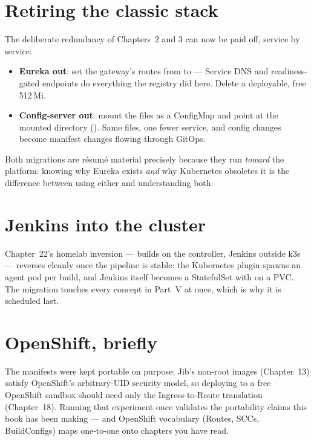 \section{Retiring the classic stack}

The deliberate redundancy of Chapters~2 and 3 can now be paid off,
service by service:

\begin{itemize}
  \item \textbf{Eureka out}: set the gateway's routes from
   to  ---
  Service DNS and readiness-gated endpoints do everything the registry
  did here. Delete a deployable, free 512\,Mi.
  \item \textbf{Config-server out}: mount the 
  files as a ConfigMap and point
   at the mounted directory
  (). Same files, one fewer service, and
  config changes become manifest changes flowing through GitOps.
\end{itemize}

Both migrations are résumé material precisely because they run
\emph{toward} the platform: knowing why Eureka exists \emph{and} why
Kubernetes obsoletes it is the difference between using either and
understanding both.

\section{Jenkins into the cluster}

Chapter~22's homelab inversion --- builds on the controller, Jenkins
outside k3s --- reverses cleanly once the pipeline is stable: the
Kubernetes plugin spawns an agent pod per build, and Jenkins itself
becomes a StatefulSet with  on a PVC. The
migration touches every concept in Part~V at once, which is why it is
scheduled last.

\section{OpenShift, briefly}

The manifests were kept portable on purpose: Jib's non-root images
(Chapter~13) satisfy OpenShift's arbitrary-UID security model, so
deploying to a free OpenShift sandbox should need only the
Ingress-to-Route translation (Chapter~18). Running that experiment
once validates the portability claims this book has been making ---
and OpenShift vocabulary (Routes, SCCs, BuildConfigs) maps one-to-one
onto chapters you have read.

